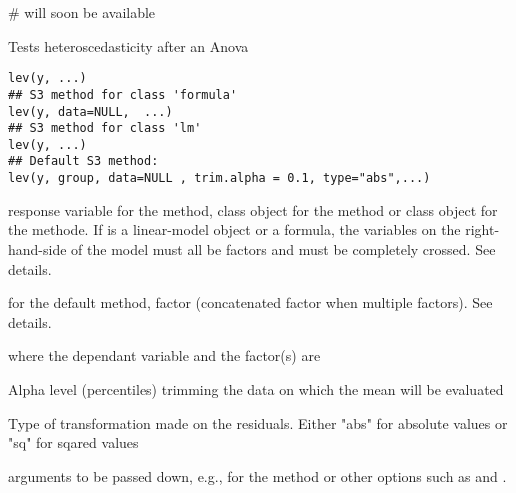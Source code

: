 \documentclass[a4paper]{book}
\begin{document}
%
\begin{Examples}
\begin{ExampleCode}
# will soon be available
\end{ExampleCode}
\end{Examples}
\newpage
{}
%
\begin{Description}\relax
Tests heteroscedasticity after an Anova
\end{Description}
%
\begin{Usage}
\begin{verbatim}
lev(y, ...)
## S3 method for class 'formula'
lev(y, data=NULL,  ...)
## S3 method for class 'lm'
lev(y, ...)
## Default S3 method:
lev(y, group, data=NULL , trim.alpha = 0.1, type="abs",...)
\end{verbatim}
\end{Usage}
%
\begin{Arguments}
\begin{ldescription}
\item[\code{y}] response variable for the  method, 
class object for the  method or 
class object for the  methode. If 
is a linear-model object or a formula, the variables on the right-hand-side
of the model must all be factors and must be completely crossed. See details.
\item[\code{group}] for the default method, factor (concatenated factor when multiple factors). See details.
\item[\code{data}]  where the dependant variable and the factor(s) are
\item[\code{trim.alpha}] Alpha level (percentiles) trimming the data on which the mean will be evaluated
\item[\code{type}] Type of transformation made on the residuals. Either "abs" for absolute values or "sq" for sqared values
\item[\code{...}] arguments to be passed down, e.g.,  for the
 method or other options such as  and .
\end{ldescription}
\end{Arguments}
%
\end{document}
